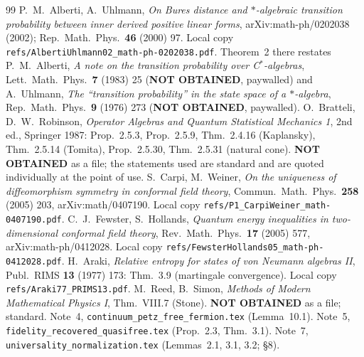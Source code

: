 \documentclass[11pt]{article}
\begin{document}
\begin{thebibliography}{99}
 P.~M.~Alberti, A.~Uhlmann, \emph{On Bures distance and $*$-algebraic transition probability between
inner derived positive linear forms}, arXiv:math-ph/0202038 (2002); Rep.\ Math.\ Phys.\ \textbf{46} (2000) 97.
Local copy \texttt{refs/AlbertiUhlmann02\_math-ph-0202038.pdf}.  Theorem~2 there restates
P.~M.~Alberti, \emph{A note on the transition probability over C$^*$-algebras}, Lett.\ Math.\ Phys.\ \textbf{7}
(1983) 25 (\textbf{NOT OBTAINED}, paywalled) and A.~Uhlmann, \emph{The ``transition probability'' in the state space
of a $*$-algebra}, Rep.\ Math.\ Phys.\ \textbf{9} (1976) 273 (\textbf{NOT OBTAINED}, paywalled).
 O.~Bratteli, D.~W.~Robinson, \emph{Operator Algebras and Quantum Statistical Mechanics 1}, 2nd ed.,
Springer 1987: Prop.~2.5.3, Prop.~2.5.9, Thm.~2.4.16 (Kaplansky), Thm.~2.5.14 (Tomita), Prop.~2.5.30,
Thm.~2.5.31 (natural cone).  \textbf{NOT OBTAINED} as a file; the statements used are standard and are quoted
individually at the point of use.
 S.~Carpi, M.~Weiner, \emph{On the uniqueness of diffeomorphism symmetry in conformal field theory},
Commun.\ Math.\ Phys.\ \textbf{258} (2005) 203, arXiv:math/0407190.
Local copy \texttt{refs/P1\_CarpiWeiner\_math-0407190.pdf}.
 C.~J.~Fewster, S.~Hollands, \emph{Quantum energy inequalities in two-dimensional conformal field
theory}, Rev.\ Math.\ Phys.\ \textbf{17} (2005) 577, arXiv:math-ph/0412028.
Local copy \texttt{refs/FewsterHollands05\_math-ph-0412028.pdf}.
 H.~Araki, \emph{Relative entropy for states of von Neumann algebras II}, Publ.\ RIMS \textbf{13}
(1977) 173: Thm.~3.9 (martingale convergence).  Local copy \texttt{refs/Araki77\_PRIMS13.pdf}.
 M.~Reed, B.~Simon, \emph{Methods of Modern Mathematical Physics I}, Thm.~VIII.7 (Stone).
\textbf{NOT OBTAINED} as a file; standard.
 Note~4, \texttt{continuum\_petz\_free\_fermion.tex} (Lemma~10.1).
 Note~5, \texttt{fidelity\_recovered\_quasifree.tex} (Prop.~2.3, Thm.~3.1).
 Note~7, \texttt{universality\_normalization.tex} (Lemmas~2.1, 3.1, 3.2; \S8).
\end{thebibliography}
\end{document}
